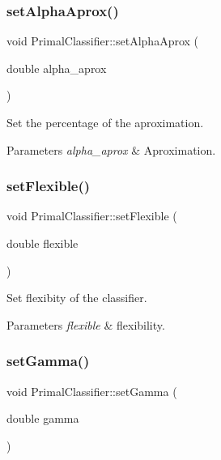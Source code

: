 \subsubsection{\texorpdfstring{set\+Alpha\+Aprox()}{setAlphaAprox()}}
{\footnotesize\ttfamily void Primal\+Classifier\+::set\+Alpha\+Aprox (\begin{DoxyParamCaption}\item[{double}]{alpha\+\_\+aprox }\end{DoxyParamCaption})}



Set the percentage of the aproximation. 


\begin{DoxyParams}{Parameters}
{\em alpha\+\_\+aprox} & Aproximation. \\
\hline
\end{DoxyParams}
\mbox{\label{class_primal_classifier_acf3edea17de00a41c33d0fee4fabd4da}} 
\subsubsection{\texorpdfstring{set\+Flexible()}{setFlexible()}}
{\footnotesize\ttfamily void Primal\+Classifier\+::set\+Flexible (\begin{DoxyParamCaption}\item[{double}]{flexible }\end{DoxyParamCaption})}



Set flexibity of the classifier. 


\begin{DoxyParams}{Parameters}
{\em flexible} & flexibility. \\
\hline
\end{DoxyParams}
\mbox{\label{class_primal_classifier_a2d1443916a530c9b3729fb748097db50}} 
\subsubsection{\texorpdfstring{set\+Gamma()}{setGamma()}}
{\footnotesize\ttfamily void Primal\+Classifier\+::set\+Gamma (\begin{DoxyParamCaption}\item[{double}]{gamma }\end{DoxyParamCaption})}




